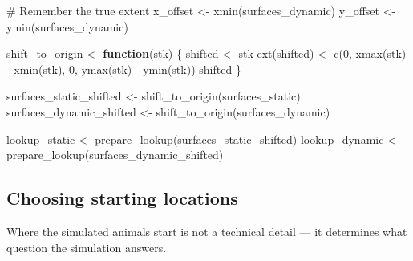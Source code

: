 \documentclass[
  letterpaper,
  DIV=11,
  numbers=noendperiod]{scrartcl}
\newenvironment{Shaded}{\begin{snugshade}}{\end{snugshade}}
\newcommand{\CommentTok}[1]{\textcolor[rgb]{0.37,0.37,0.37}{#1}}
\newcommand{\ControlFlowTok}[1]{\textcolor[rgb]{0.00,0.23,0.31}{\textbf{#1}}}
\newcommand{\DecValTok}[1]{\textcolor[rgb]{0.68,0.00,0.00}{#1}}
\newcommand{\FunctionTok}[1]{\textcolor[rgb]{0.28,0.35,0.67}{#1}}
\newcommand{\NormalTok}[1]{\textcolor[rgb]{0.00,0.23,0.31}{#1}}
\newcommand{\OtherTok}[1]{\textcolor[rgb]{0.00,0.23,0.31}{#1}}
\newcommand{\SpecialCharTok}[1]{\textcolor[rgb]{0.37,0.37,0.37}{#1}}
\begin{document}
\begin{Shaded}
\begin{Highlighting}[]
\CommentTok{\# Remember the true extent}
\NormalTok{x\_offset }\OtherTok{\textless{}{-}} \FunctionTok{xmin}\NormalTok{(surfaces\_dynamic)}
\NormalTok{y\_offset }\OtherTok{\textless{}{-}} \FunctionTok{ymin}\NormalTok{(surfaces\_dynamic)}

\NormalTok{shift\_to\_origin }\OtherTok{\textless{}{-}} \ControlFlowTok{function}\NormalTok{(stk) \{}
\NormalTok{  shifted }\OtherTok{\textless{}{-}}\NormalTok{ stk}
  \FunctionTok{ext}\NormalTok{(shifted) }\OtherTok{\textless{}{-}} \FunctionTok{c}\NormalTok{(}\DecValTok{0}\NormalTok{, }\FunctionTok{xmax}\NormalTok{(stk) }\SpecialCharTok{{-}} \FunctionTok{xmin}\NormalTok{(stk), }\DecValTok{0}\NormalTok{, }\FunctionTok{ymax}\NormalTok{(stk) }\SpecialCharTok{{-}} \FunctionTok{ymin}\NormalTok{(stk))}
\NormalTok{  shifted}
\NormalTok{\}}

\NormalTok{surfaces\_static\_shifted  }\OtherTok{\textless{}{-}} \FunctionTok{shift\_to\_origin}\NormalTok{(surfaces\_static)}
\NormalTok{surfaces\_dynamic\_shifted }\OtherTok{\textless{}{-}} \FunctionTok{shift\_to\_origin}\NormalTok{(surfaces\_dynamic)}

\NormalTok{lookup\_static  }\OtherTok{\textless{}{-}} \FunctionTok{prepare\_lookup}\NormalTok{(surfaces\_static\_shifted)}
\NormalTok{lookup\_dynamic }\OtherTok{\textless{}{-}} \FunctionTok{prepare\_lookup}\NormalTok{(surfaces\_dynamic\_shifted)}
\end{Highlighting}
\end{Shaded}

\subsection{Choosing starting
locations}\label{choosing-starting-locations}

Where the simulated animals start is not a technical detail --- it
determines what question the simulation answers.
\end{document}
